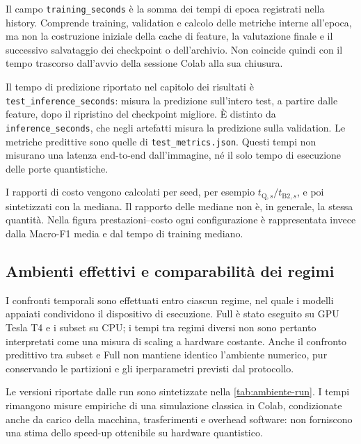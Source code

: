 Il campo \texttt{training\_seconds} è la somma dei tempi di epoca
registrati nella history. Comprende training, validation e calcolo
delle metriche interne all'epoca, ma non la costruzione iniziale della
cache di feature, la valutazione finale e il successivo salvataggio
dei checkpoint o dell'archivio. Non coincide quindi con il tempo
trascorso dall'avvio della sessione Colab alla sua chiusura.

Il tempo di predizione riportato nel capitolo dei risultati è
\texttt{test\_inference\_seconds}: misura la predizione sull'intero
test, a partire dalle feature, dopo il ripristino del checkpoint
migliore. È distinto da \texttt{inference\_seconds}, che negli
artefatti misura la predizione sulla validation. Le metriche
predittive sono quelle di \texttt{test\_metrics.json}.
Questi tempi non misurano una latenza end-to-end dall'immagine,
né il solo tempo di esecuzione delle porte quantistiche.

I rapporti di costo vengono calcolati per seed, per esempio
\(t_{\mathrm Q,s}/t_{\mathrm{B2},s}\), e poi sintetizzati con la mediana.
Il rapporto delle mediane non è, in generale, la stessa quantità.
Nella figura prestazioni--costo ogni configurazione è rappresentata
invece dalla Macro-F1 media e dal tempo di training mediano.

\subsection{Ambienti effettivi e comparabilità dei regimi}
\label{sec:ambiente-hardware}

I confronti temporali sono effettuati entro ciascun regime, nel quale
i modelli appaiati condividono il dispositivo di esecuzione. Full è
stato eseguito su GPU Tesla T4 e i subset su CPU; i tempi tra regimi
diversi non sono pertanto interpretati come una misura di scaling
a hardware costante. Anche il confronto predittivo tra subset e Full
non mantiene identico l'ambiente numerico, pur conservando le
partizioni e gli iperparametri previsti dal protocollo.

Le versioni riportate dalle run sono sintetizzate nella
\cref{tab:ambiente-run}. I tempi rimangono misure empiriche di una
simulazione classica in Colab, condizionate anche da carico della
macchina, trasferimenti e overhead software: non forniscono una
stima dello speed-up ottenibile su hardware quantistico.

